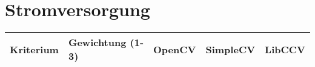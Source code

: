 \section{Stromversorgung}



\begin{table}[h]
\begin{tabular}{|p{4.5cm}|p{3.5cm}|p{2cm}|p{2cm}|p{2cm}|}\hline
	
	\textbf{Kriterium}	& 	\textbf{Gewichtung (1-3)} & \textbf{OpenCV} & \textbf{SimpleCV} & \textbf{LibCCV}\\\hline
	
	
	
\end{tabular}\\
\end{table}